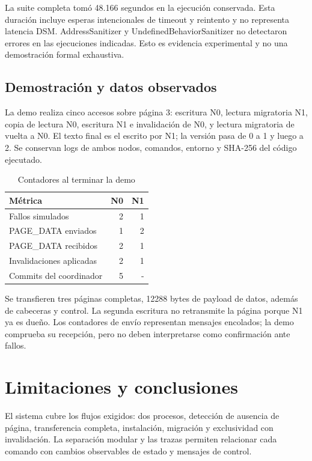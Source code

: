 \documentclass[conference]{IEEEtran}
\begin{document}
La suite completa tomó 48.166 segundos en la ejecución conservada. Esta duración
incluye esperas intencionales de timeout y reintento y no representa latencia DSM.
AddressSanitizer y UndefinedBehaviorSanitizer no detectaron errores en las ejecuciones
indicadas. Esto es evidencia experimental y no una demostración formal exhaustiva.

\subsection{Demostración y datos observados}
La demo realiza cinco accesos sobre página 3: escritura N0, lectura migratoria N1,
copia de lectura N0, escritura N1 e invalidación de N0, y lectura migratoria de vuelta
a N0. El texto final es el escrito por N1; la versión pasa de 0 a 1 y luego a 2.
Se conservan logs de ambos nodos, comandos, entorno y SHA-256 del código ejecutado.

\begin{table}[t]
\caption{Contadores al terminar la demo}
\centering
\begin{tabular}{lrr}
\toprule
Métrica & N0 & N1\\
\midrule
Fallos simulados & 2 & 1\\
PAGE\_DATA enviados & 1 & 2\\
PAGE\_DATA recibidos & 2 & 1\\
Invalidaciones aplicadas & 2 & 1\\
Commits del coordinador & 5 & -\\
\bottomrule
\end{tabular}
\end{table}

Se transfieren tres páginas completas, 12288 bytes de payload de datos, además de
cabeceras y control. La segunda escritura no retransmite la página porque N1 ya es
dueño. Los contadores de envío representan mensajes encolados; la demo comprueba
su recepción, pero no deben interpretarse como confirmación ante fallos.

\section{Limitaciones y conclusiones}
El sistema cubre los flujos exigidos: dos procesos, detección de ausencia de página,
transferencia completa, instalación, migración y exclusividad con invalidación.
La separación modular y las trazas permiten relacionar cada comando con cambios
observables de estado y mensajes de control.
\end{document}
